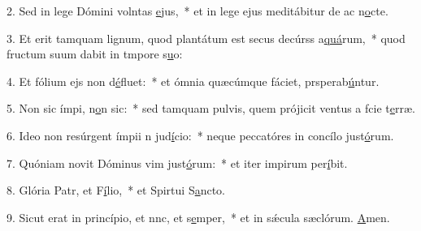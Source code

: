 2. Sed in lege Dómini volntas \uline{e}jus,~* et in lege ejus meditábitur de ac n\uline{o}cte.\par 
3. Et erit tamquam lignum, quod plantátum est secus decúrss a\uline{quá}rum,~* quod fructum suum dabit in tmpore s\uline{u}o:\par 
4. Et fólium ejs non d\uline{é}fluet:~* et ómnia quæcúmque fáciet, prsperab\uline{ú}ntur.\par 
5. Non sic ímpi, n\uline{o}n sic:~* sed tamquam pulvis, quem prójicit ventus a fcie t\uline{e}rræ.\par 
6. Ideo non resúrgent ímpii n jud\uline{í}cio:~* neque peccatóres in concílo just\uline{ó}rum.\par 
7. Quóniam novit Dóminus vim just\uline{ó}rum:~* et iter impirum per\uline{í}bit.\par 
8. Glória Patr, et F\uline{í}lio,~* et Spirtui S\uline{a}ncto.\par 
9. Sicut erat in princípio, et nnc, et s\uline{e}mper,~* et in sǽcula sæclórum. \uline{A}men.\par 
